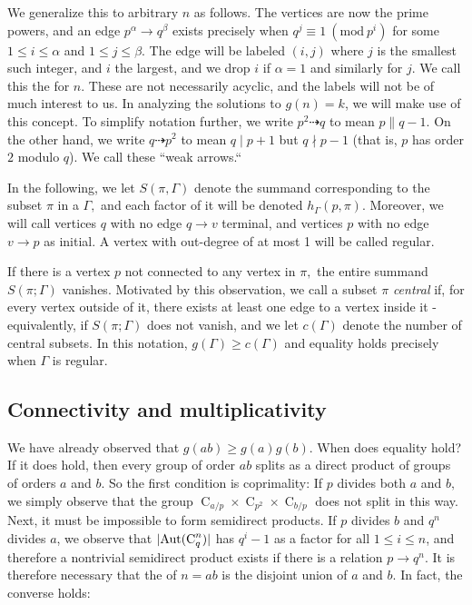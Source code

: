 \documentclass[draft]{article}
\DeclarePairedDelimiter\abs{\lvert}{\rvert}
\newcommand{\aut}[1]{\operatorname{Aut}(#1)}
\newcommand{\cyc}[1]{\operatorname{C}_{#1}}
\newcommand{\Mod}[1]{\ (\mathrm{mod} \ #1)}
\theoremstyle{plain}
\theoremstyle{definition}
\begin{document}
We generalize this to arbitrary $n$ as follows. The vertices are now the prime powers, and an edge $p^\alpha \rightarrow q^\beta$ exists precisely when $q^j \equiv 1 \Mod{p^i}$ for some $1 \le i \le \alpha$ and $1 \le j \le \beta$. The edge will be labeled $(i, j)$ where $j$ is the smallest such integer, and $i$ the largest, and we drop $i$ if $\alpha = 1$ and similarly for $j$. We call this the \emph{\ghg} for $n.$ These are not necessarily acyclic, and the labels will not be of much interest to us. In analyzing the solutions to $g(n) = k$, we will make use of this concept. To simplify notation further, we write $p^2 \dashrightarrow q$ to mean $p \parallel q - 1$. On the other hand, we write $q \dashrightarrow p^2$ to mean $q \mid p + 1$ but $q \nmid p - 1$ (that is, $p$ has order $2$ modulo $q$). We call these ``weak arrows.``

In the following, we let $S(\pi, \Gamma)$ denote the summand corresponding to the subset $\pi$ in a \hg $\Gamma,$ and each factor of it will be denoted $h_\Gamma(p, \pi).$ Moreover, we will call vertices $q$ with no edge $q \rightarrow v$ terminal, and vertices $p$ with no edge $v \rightarrow p$ as initial. A vertex with out-degree of at most 1 will be called regular.

If there is a vertex $p$ not connected to any vertex in $\pi,$ the entire summand $S(\pi; \Gamma)$ vanishes. Motivated by this observation, we call a subset $\pi$ \emph{central} if, for every vertex outside of it, there exists at least one edge to a vertex inside it - equivalently, if $S(\pi; \Gamma)$ does not vanish, and we let $c(\Gamma)$ denote the number of central subsets. In this notation, $g(\Gamma) \ge c(\Gamma)$ and equality holds precisely when $\Gamma$ is regular.

\subsection{Connectivity and multiplicativity}
We have already observed that $g(ab) \ge g(a)g(b).$ When does equality hold? If it does hold, then every group of order $ab$ splits as a direct product of groups of orders $a$ and $b.$ So the first condition is coprimality: If $p$ divides both $a$ and $b,$ we simply observe that the group $\cyc{a/p} \times \cyc{p^2} \times \cyc{b/p}$ does not split in this way. Next, it must be impossible to form semidirect products. If $p$ divides $b$ and $q^n$ divides $a$, we observe that $\abs{\aut{\cyc{q}^n}}$ has $q^i - 1$ as a factor for all $1 \le i \le n$, and therefore a nontrivial semidirect product exists if there is a relation $p \rightarrow q^n.$ It is therefore necessary that the \ghg of $n = ab$ is the disjoint union of $a$ and $b$. In fact, the converse holds:
\end{document}
